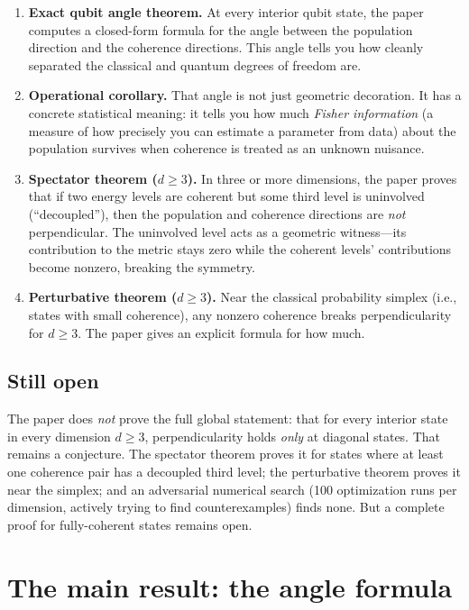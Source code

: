 \documentclass[11pt,a4paper]{article}
\begin{document}
\begin{enumerate}[leftmargin=1.5em]
\item \textbf{Exact qubit angle theorem.}  At every interior qubit state, the paper computes a closed-form formula for the angle between the population direction and the coherence directions.  This angle tells you how cleanly separated the classical and quantum degrees of freedom are.

\item \textbf{Operational corollary.}  That angle is not just geometric decoration.  It has a concrete statistical meaning: it tells you how much \emph{Fisher information} (a measure of how precisely you can estimate a parameter from data) about the population survives when coherence is treated as an unknown nuisance.

\item \textbf{Spectator theorem ($d \geq 3$).}  In three or more dimensions, the paper proves that if two energy levels are coherent but some third level is uninvolved (``decoupled''), then the population and coherence directions are \emph{not} perpendicular.  The uninvolved level acts as a geometric witness---its contribution to the metric stays zero while the coherent levels' contributions become nonzero, breaking the symmetry.

\item \textbf{Perturbative theorem ($d \geq 3$).}  Near the classical probability simplex (i.e., states with small coherence), any nonzero coherence breaks perpendicularity for $d \geq 3$.  The paper gives an explicit formula for how much.
\end{enumerate}

\subsection*{Still open}

The paper does \emph{not} prove the full global statement: that for every interior state in every dimension $d \geq 3$, perpendicularity holds \emph{only} at diagonal states.  That remains a conjecture.  The spectator theorem proves it for states where at least one coherence pair has a decoupled third level; the perturbative theorem proves it near the simplex; and an adversarial numerical search (100 optimization runs per dimension, actively trying to find counterexamples) finds none.  But a complete proof for fully-coherent states remains open.

\section*{The main result: the angle formula}
\end{document}
